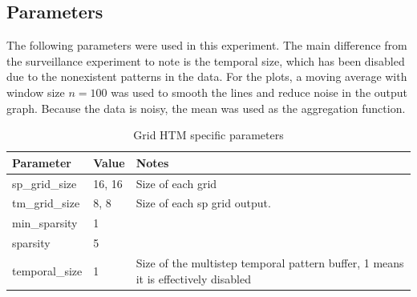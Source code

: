 \subsection{Parameters}
The following parameters were used in this experiment. The main difference from the surveillance experiment to note is the temporal size, which has been disabled due to the nonexistent patterns in the data. For the plots, a moving average with window size $n=100$ was used to smooth the lines and reduce noise in the output graph. Because the data is noisy, the mean was used as the aggregation function.
\begin{table}[H]
    \centering
    \begin{tabularx}{\linewidth}{@{}XlX@{}}
        \toprule
        \textbf{Parameter} & \textbf{Value} & \textbf{Notes}                                                                    \\
        \midrule
        sp\_grid\_size     & 16, 16         & Size of each grid                                                                 \\
        tm\_grid\_size     & 8, 8           & Size of each \gls*{sp} grid output.                                               \\
        min\_sparsity      & 1              &                                                                                   \\
        sparsity           & 5              &                                                                                   \\
        temporal\_size     & 1              & Size of the multistep temporal pattern buffer, 1 means it is effectively disabled \\
        \bottomrule
    \end{tabularx}
    \caption{Grid HTM specific parameters}
    \label{tab:sperm_params}
\end{table}
